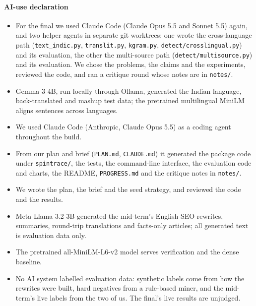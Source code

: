 \documentclass[11pt,a4paper]{article}
\newcommand{\code}[1]{\texttt{#1}}
\begin{document}
\paragraph{AI-use declaration}
\begin{itemize}[itemsep=0.25em]
  \item For the final we used Claude Code (Claude Opus 5.5 and Sonnet 5.5) again, and two helper agents in separate git worktrees: one wrote the cross-language path (\code{text\_indic.py}, \code{translit.py}, \code{kgram.py}, \code{detect/crosslingual.py}) and its evaluation, the other the multi-source path (\code{detect/multisource.py}) and its evaluation. We chose the problems, the claims and the experiments, reviewed the code, and ran a critique round whose notes are in \code{notes/}.
  \item Gemma 3 4B, run locally through Ollama, generated the Indian-language, back-translated and mashup test data; the pretrained multilingual MiniLM aligns sentences across languages.
  \item We used Claude Code (Anthropic, Claude Opus 5.5) as a coding agent throughout the build.
  \item From our plan and brief (\code{PLAN.md}, \code{CLAUDE.md}) it generated the package code under \code{spintrace/}, the tests, the command-line interface, the evaluation code and charts, the README, \code{PROGRESS.md} and the critique notes in \code{notes/}.
  \item We wrote the plan, the brief and the seed strategy, and reviewed the code and the results.
  \item Meta Llama 3.2 3B generated the mid-term's English SEO rewrites, summaries, round-trip translations and facts-only articles; all generated text is evaluation data only.
  \item The pretrained all-MiniLM-L6-v2 model serves verification and the dense baseline.
  \item No AI system labelled evaluation data: synthetic labels come from how the rewrites were built, hard negatives from a rule-based miner, and the mid-term's live labels from the two of us. The final's live results are unjudged.
\end{itemize}

\clearpage
\renewcommand{\refname}{References}
\end{document}
